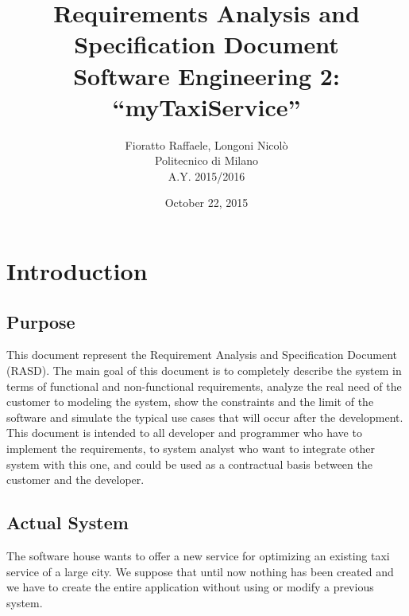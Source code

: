 \documentclass[a4paper,12pt]{article}%
\newcounter{func_req_counter}
\begin{document}
\begin{figure}
  \centering
	\def\svgwidth{\columnwidth}
    \resizebox{0.35\textwidth}{!}{}
\end{figure}
\title{{\Huge \textbf{R}equirements \textbf{A}nalysis and\\
\textbf{S}pecification \textbf{D}ocument}\\{\Large Software Engineering 2: ``myTaxiService''}}

\author{Fioratto Raffaele, Longoni Nicol\`{o}
\\Politecnico di Milano
\\{\small A.Y. 2015/2016}}
\date{October 22, 2015}
\maketitle
\newpage
\tableofcontents
\newpage
\section{Introduction}

\subsection{Purpose}
This document represent the Requirement Analysis and Specification Document
(RASD). The main goal of this document is to completely describe the system
in terms of functional and non-functional requirements, analyze the real need
of the customer to modeling the system, show the constraints and the limit
of the software and simulate the typical use cases that will occur after the
development. This document is intended to all developer and programmer who
have to implement the requirements, to system analyst who want to integrate
other system with this one, and could be used as a contractual basis between
the customer and the developer.

\subsection{Actual System}
The software house wants to offer a new service for optimizing an existing 
taxi service of a large city. We suppose that until now nothing has been 
created and we have to create the entire application without using or modify 
a previous system.
\end{document}
